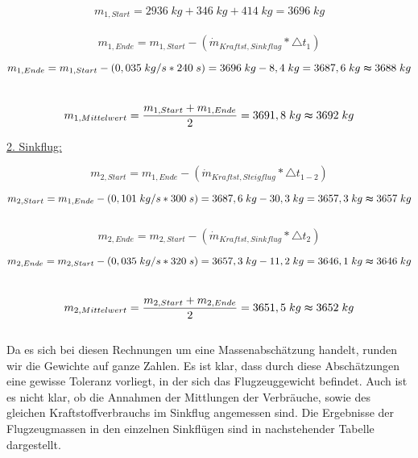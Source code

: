 \begin{equation*}
m_{1,Start} = 2936 \; {kg} + 346 \; {kg} +414 \; {kg} = 3696 \; {kg}
\end{equation*}
\\

\begin{equation*}
m_{1,Ende} = m_{1,Start} - (\dot{m}_{Kraftst,Sinkflug} * \triangle t_1)
\end{equation*}

\begin{equation*}
m_{1,Ende} = m_{1,Start} - (0,035 \; {kg/s} * 240 \; {s}) = 3696 \; {kg} - 8,4 \; {kg} = 3687,6 \; {kg} \thickapprox 3688 \; {kg}
\end{equation*} \\

\begin{equation*}
m_{1,Mittelwert} = \frac{m_{1,Start} + m_{1,Ende}}{2} = 3691,8 \; {kg} \thickapprox 3692 \; {kg}
\end{equation*}


\underline{2. Sinkflug:}

\begin{equation*}
m_{2,Start} = m_{1,Ende} - (\dot{m}_{Kraftst,Steigflug} * \triangle t_{1-2})
\end{equation*}

\begin{equation*}
m_{2,Start} = m_{1,Ende} - (0,101 \; {kg/s} * 300 \; {s}) = 3687,6 \; {kg} - 30,3 \; {kg} = 3657,3 \; {kg} \thickapprox 3657 \; {kg}
\end{equation*} \\

\begin{equation*}
m_{2,Ende} = m_{2,Start} - (\dot{m}_{Kraftst,Sinkflug} * \triangle t_2)
\end{equation*}

\begin{equation*}
m_{2,Ende} = m_{2,Start} - (0,035 \; {kg/s} * 320 \; {s}) = 3657,3 \; {kg} - 11,2 \; {kg} = 3646,1 \; {kg} \thickapprox 3646 \; {kg}
\end{equation*} \\

\begin{equation*}
m_{2,Mittelwert} = \frac{m_{2,Start} + m_{2,Ende}}{2} = 3651,5 \; {kg} \thickapprox 3652 \; {kg}
\end{equation*} \\

Da es sich bei diesen Rechnungen um eine Massenabschätzung handelt, runden wir die Gewichte auf ganze Zahlen. Es ist klar, dass durch diese Abschätzungen eine gewisse Toleranz vorliegt, in der sich das Flugzeuggewicht befindet. Auch ist es nicht klar, ob die Annahmen der Mittlungen der Verbräuche, sowie des gleichen Kraftstoffverbrauchs im Sinkflug angemessen sind. Die Ergebnisse der Flugzeugmassen in den einzelnen Sinkflügen sind in nachstehender Tabelle dargestellt.

